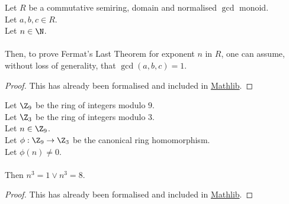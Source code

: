 \begin{lemma}
    \label{lmm:fermatLastTheoremWith_of_fermatLastTheoremWith_coprime}
    \leanok
    Let $R$ be a commutative semiring, domain and normalised $\gcd$ monoid.\\%
    Let $a, b, c \in R$. \\
    Let $n \in \N$. \\\\
    Then, to prove Fermat's Last Theorem for exponent $n$ in $R$,
    one can assume, without loss of generality, that $\gcd(a,b,c)=1$.
  \end{lemma}
  \begin{proof}
    \leanok
    This has already been formalised and included in \href{https://pitmonticone.github.io/FLT3/docs/FLT3/Mathlib/NumberTheory/FLT/Basic.html#fermatLastTheoremWith_of_fermatLastTheoremWith_coprime}{Mathlib}.
  \end{proof}

  \begin{lemma}
    \label{lmm:cube_of_castHom_ne_zero}
    \leanok
    Let $\Z_9$ be the ring of integers modulo $9$. \\
    Let $\Z_3$ be the ring of integers modulo $3$. \\
    Let $n \in \Z_9$. \\
    Let $\phi : \Z_9 \to \Z_3$ be the canonical ring homomorphism. \\
    Let $\phi(n) \neq 0$. \\ \\
    Then $n^3=1 \lor n^3=8$.
  \end{lemma}
  \begin{proof}
    \leanok
    This has already been formalised and included in \href{https://pitmonticone.github.io/FLT3/docs/FLT3/Mathlib/NumberTheory/FLT/Three.html#cube_of_castHom_ne_zero}{Mathlib}.
  \end{proof}
